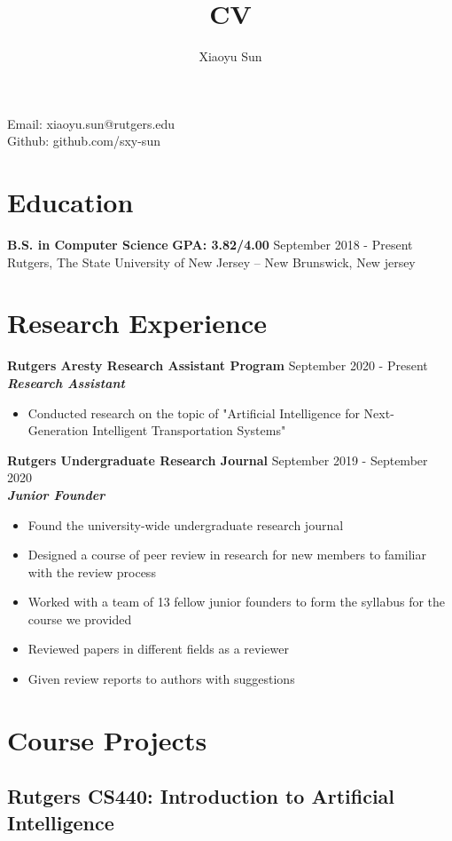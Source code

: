 \documentclass{article}
\makeatletter
\renewcommand{\maketitle}{
\begin{center}
{\huge\bfseries
\theauthor}

\vspace{.25em}

Email: xiaoyu.sun@rutgers.edu\\
Github: github.com/sxy-sun
\end{center}
}
\makeatother
\begin{document}
\title{CV}
\author{Xiaoyu Sun}
\maketitle

\section{Education}
\textbf{B.S. in Computer Science} \space \textbf{GPA: 3.82/4.00}
\hfill{September 2018 - Present}\\
Rutgers, The State University of New Jersey – New Brunswick, New jersey

\section{Research Experience}
\textbf{Rutgers Aresty Research Assistant Program}
\hfill{September 2020 - Present}\\
\textit{\textbf{Research Assistant}}
\begin{itemize}
  \itemsep0em
  \item Conducted research on the topic of "Artificial Intelligence for Next-Generation Intelligent Transportation Systems"\\
\end{itemize}

\noindent \textbf{Rutgers Undergraduate Research Journal}
\hfill{September 2019 - September 2020}\\
\textit{\textbf{Junior Founder}}
\begin{itemize}
  \itemsep0em
  \item Found the university-wide undergraduate research journal
  \item Designed a course of peer review in research for new members to familiar with the
review process
  \item  Worked with a team of 13 fellow junior founders to form the syllabus for the course we
provided
  \item Reviewed papers in different fields as a reviewer
  \item Given review reports to authors with suggestions
\end{itemize}


\section{Course Projects}
\subsection*{Rutgers CS440: Introduction to Artificial Intelligence}
\end{document}
